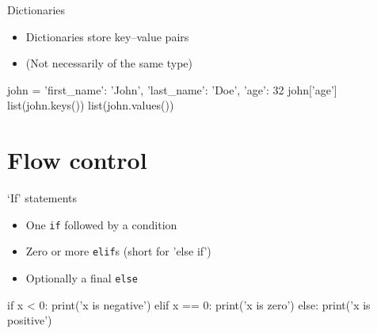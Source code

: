 \begin{frame}[fragile]{Dictionaries}
    \begin{itemize}
        \item Dictionaries store \alert{key--value pairs}
        \item (Not necessarily of the same type)
    \end{itemize}
    \vfill
    \begin{py3}
        john = {
            'first_name': 'John',
            'last_name': 'Doe',
            'age': 32
        }
        john['age']
        list(john.keys())
        list(john.values())
    \end{py3}
\end{frame}

\section{Flow control}

\begin{frame}[fragile]{`If' statements}
    \begin{itemize}
        \item One \texttt{if} followed by a condition
        \item Zero or more \texttt{elif}s (short for 'else if')
        \item Optionally a final \texttt{else}
    \end{itemize}
    \vfill
    \begin{py3}
        if x < 0:
            print('x is negative')
        elif x == 0:
            print('x is zero')
        else:
            print('x is positive')
    \end{py3}
\end{frame}

